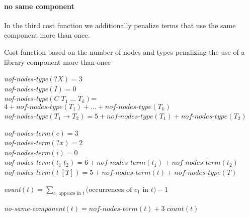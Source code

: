   \paragraph{no same component}
In the third cost function we additionally penalize terms that use the same component more than once.
%
\begin{algorithm}
\caption{Cost function based on the number of nodes and types penalizing the use of a library component more than once}

\textit{nof-nodes-type}$({?X}) = 3$\\
\textit{nof-nodes-type}$(I) = 0$\\
\textit{nof-nodes-type}$(C\; T_1\; \ldots\; T_k)$= $4 + \textit{nof-nodes-type}(T_1) + \ldots + \textit{nof-nodes-type}(T_k)$\\
\textit{nof-nodes-type}$(T_1 \rightarrow T_2) = 5 + \textit{nof-nodes-type}(T_1) + \textit{nof-nodes-type}(T_2)$\\

\BlankLine

\textit{nof-nodes-term}$(c) = 3$\\
\textit{nof-nodes-term}$({?x}) = 2$\\
\textit{nof-nodes-term}$(i) = 0$\\
\textit{nof-nodes-term}$(t_1\; t_2) = 6 + \textit{nof-nodes-term}(t_1) + \textit{nof-nodes-term}(t_2)$\\
\textit{nof-nodes-term}$(t\; [T]) = 5 + \textit{nof-nodes-term}(t) + \textit{nof-nodes-type}(T)$\\

\BlankLine

\textit{count}$(t) = \displaystyle \sum_{c_i \text{ appears in } t} \text{(occurrences of $c_1$ in $t$)} - 1$\\

\BlankLine

\textit{no-same-component}$(t) = \textit{nof-nodes-term}(t) + 3\; \textit{count}(t)$
\end{algorithm} 
%

